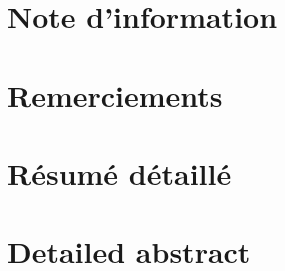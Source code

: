\newpage                    %
\clearpage

\pagetitre                  %

\newpage                    %
\clearpage
\pagecredits                %

\newpage                    %
\clearpage
\pagededicace               %

\newpage                    %
\pagevide
\setcounter{page}{0}

\newpage 

\justifying
\chapter{Note d'information} 


\chapter{Remerciements}


\chapter{Résumé détaillé}


\chapter{Detailed abstract}


\sommaire
 \newpage                    %
\pagevide